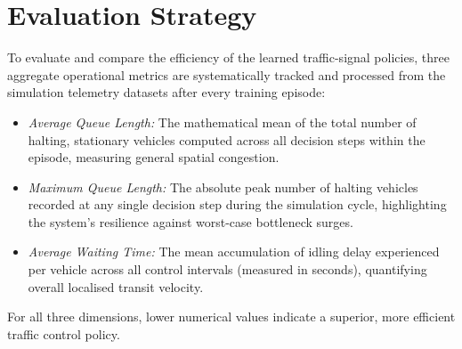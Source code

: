 \documentclass[12pt]{article}
\begin{document}
\section{Evaluation Strategy}
	
	
	To evaluate and compare the efficiency of the learned traffic-signal policies, three aggregate operational metrics are systematically tracked and processed from the simulation telemetry datasets after every training episode:
	\begin{itemize}[noitemsep]
		\item \emph{Average Queue Length:} The mathematical mean of the total number of halting, stationary vehicles computed across all decision steps within the episode, measuring general spatial congestion.
		\item \emph{Maximum Queue Length:} The absolute peak number of halting vehicles recorded at any single decision step during the simulation cycle, highlighting the system's resilience against worst-case bottleneck surges.
		\item \emph{Average Waiting Time:} The mean accumulation of idling delay experienced per vehicle across all control intervals (measured in seconds), quantifying overall localised transit velocity.
	\end{itemize}
	For all three dimensions, lower numerical values indicate a superior, more efficient traffic control policy.
	
\end{document}

